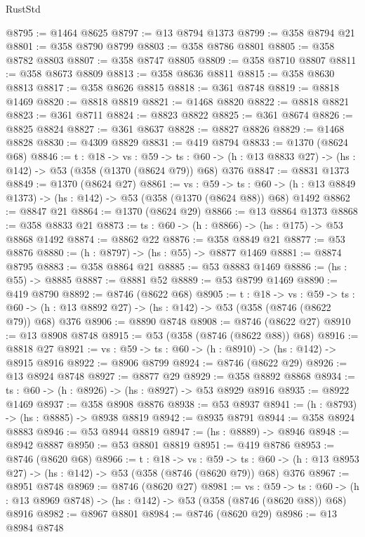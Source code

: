 \begin{lexlean}{RustStd}
\begin{coremodule}
@8795 := @1464 @8625
@8797 := @13 @8794 @1373
@8799 := @358 @8794 @21
@8801 := @358 @8790 @8799
@8803 := @358 @8786 @8801
@8805 := @358 @8782 @8803
@8807 := @358 @8747 @8805
@8809 := @358 @8710 @8807
@8811 := @358 @8673 @8809
@8813 := @358 @8636 @8811
@8815 := @358 @8630 @8813
@8817 := @358 @8626 @8815
@8818 := @361 @8748
@8819 := @8818 @1469
@8820 := @8818 @8819
@8821 := @1468 @8820
@8822 := @8818 @8821
@8823 := @361 @8711
@8824 := @8823 @8822
@8825 := @361 @8674
@8826 := @8825 @8824
@8827 := @361 @8637
@8828 := @8827 @8826
@8829 := @1468 @8828
@8830 := @4309 @8829
@8831 := @419 @8794
@8833 := @1370 (@8624 @68)
@8846 := {t : @18} ->
  {vs : @59} ->
  {ts : @60} -> (h : @13 @8833 @27) -> (hs : @142) -> @53 (@358 (@1370 (@8624 @79)) @68) @376
@8847 := @8831 @1373
@8849 := @1370 (@8624 @27)
@8861 := {vs : @59} ->
  {ts : @60} -> (h : @13 @8849 @1373) -> (hs : @142) -> @53 (@358 (@1370 (@8624 @88)) @68) @1492
@8862 := @8847 @21
@8864 := @1370 (@8624 @29)
@8866 := @13 @8864 @1373
@8868 := @358 @8833 @21
@8873 := {ts : @60} -> (h : @8866) -> (hs : @175) -> @53 @8868 @1492
@8874 := @8862 @22
@8876 := @358 @8849 @21
@8877 := @53 @8876
@8880 := (h : @8797) -> (hs : @55) -> @8877 @1469
@8881 := @8874 @8795
@8883 := @358 @8864 @21
@8885 := @53 @8883 @1469
@8886 := (hs : @55) -> @8885
@8887 := @8881 @52
@8889 := @53 @8799 @1469
@8890 := @419 @8790
@8892 := @8746 (@8622 @68)
@8905 := {t : @18} ->
  {vs : @59} ->
  {ts : @60} -> (h : @13 @8892 @27) -> (hs : @142) -> @53 (@358 (@8746 (@8622 @79)) @68) @376
@8906 := @8890 @8748
@8908 := @8746 (@8622 @27)
@8910 := @13 @8908 @8748
@8915 := @53 (@358 (@8746 (@8622 @88)) @68)
@8916 := @8818 @27
@8921 := {vs : @59} -> {ts : @60} -> (h : @8910) -> (hs : @142) -> @8915 @8916
@8922 := @8906 @8799
@8924 := @8746 (@8622 @29)
@8926 := @13 @8924 @8748
@8927 := @8877 @29
@8929 := @358 @8892 @8868
@8934 := {ts : @60} -> (h : @8926) -> (hs : @8927) -> @53 @8929 @8916
@8935 := @8922 @1469
@8937 := @358 @8908 @8876
@8938 := @53 @8937
@8941 := (h : @8793) -> (hs : @8885) -> @8938 @8819
@8942 := @8935 @8791
@8944 := @358 @8924 @8883
@8946 := @53 @8944 @8819
@8947 := (hs : @8889) -> @8946
@8948 := @8942 @8887
@8950 := @53 @8801 @8819
@8951 := @419 @8786
@8953 := @8746 (@8620 @68)
@8966 := {t : @18} ->
  {vs : @59} ->
  {ts : @60} -> (h : @13 @8953 @27) -> (hs : @142) -> @53 (@358 (@8746 (@8620 @79)) @68) @376
@8967 := @8951 @8748
@8969 := @8746 (@8620 @27)
@8981 := {vs : @59} ->
  {ts : @60} -> (h : @13 @8969 @8748) -> (hs : @142) -> @53 (@358 (@8746 (@8620 @88)) @68) @8916
@8982 := @8967 @8801
@8984 := @8746 (@8620 @29)
@8986 := @13 @8984 @8748

\end{coremodule}
\end{lexlean}
